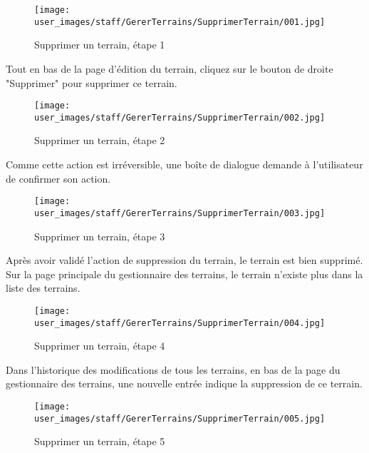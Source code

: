 \begin{figure}[H]
\centering
\texttt{[image: user\_images/staff/GererTerrains/SupprimerTerrain/001.jpg]}
\caption{Supprimer un terrain, étape 1}
\end{figure}

Tout en bas de la page d'édition du terrain, cliquez sur le bouton de droite "Supprimer" pour supprimer ce terrain.

\begin{figure}[H]
\centering
\texttt{[image: user\_images/staff/GererTerrains/SupprimerTerrain/002.jpg]}
\caption{Supprimer un terrain, étape 2}
\end{figure}

Comme cette action est irréversible, une boîte de dialogue demande à l'utilisateur de confirmer son action.

\begin{figure}[H]
\centering
\texttt{[image: user\_images/staff/GererTerrains/SupprimerTerrain/003.jpg]}
\caption{Supprimer un terrain, étape 3}
\end{figure}

Après avoir validé l'action de suppression du terrain, le terrain est bien supprimé. Sur la page principale du gestionnaire des terrains, le terrain n'existe plus dans la liste des terrains.

\begin{figure}[H]
\centering
\texttt{[image: user\_images/staff/GererTerrains/SupprimerTerrain/004.jpg]}
\caption{Supprimer un terrain, étape 4}
\end{figure}

Dans l'historique des modifications de tous les terrains, en bas de la page du gestionnaire des terrains, une nouvelle entrée indique la suppression de ce terrain.

\begin{figure}[H]
\centering
\texttt{[image: user\_images/staff/GererTerrains/SupprimerTerrain/005.jpg]}
\caption{Supprimer un terrain, étape 5}
\end{figure}
